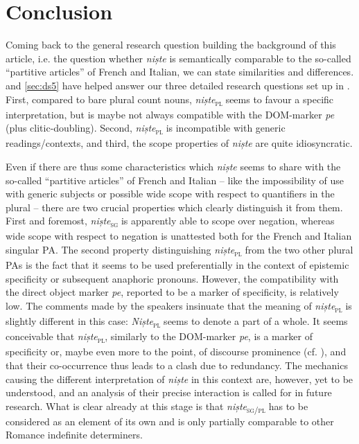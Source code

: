 \documentclass[output=paper,colorlinks,citecolor=brown]{langscibook}
\begin{document}
\section{Conclusion}\label{sec:ds6}
Coming back to the general research question building the background of this article, i.e. the question whether \textit{niște} is semantically comparable to the so-called “partitive articles” of French and Italian, we can state similarities and differences.  and \ref{sec:ds5} have helped answer our three detailed research questions set up in . First, compared to bare plural count nouns, \textit{niște}\textsubscript{\textsc{pl}} seems to favour a specific interpretation, but is maybe not always compatible with the DOM-marker \textit{pe} (plus clitic-doubling). Second, \textit{niște}\textsubscript{\textsc{pl}} is incompatible with generic readings/contexts, and third, the scope properties of \textit{niște} are quite idiosyncratic. 

Even if there are thus some characteristics which \textit{niște} seems to share with the so-called “partitive articles” of French and Italian -- like the impossibility of use with generic subjects or possible wide scope with respect to quantifiers in the plural -- there are two crucial properties which clearly distinguish it from them. First and foremost, \textit{niște}\textsubscript{\textsc{sg}} is apparently able to scope over negation, whereas wide scope with respect to negation is unattested both for the French and Italian singular PA. The second property distinguishing \textit{niște}\textsubscript{\textsc{pl}} from the two other plural PAs is the fact that it seems to be used preferentially in the context of epistemic specificity or subsequent anaphoric pronouns. However, the compatibility with the direct object marker \textit{pe}, reported to be a marker of specificity, is relatively low. The comments made by the speakers insinuate that the meaning of \textit{niște}\textsubscript{\textsc{pl}} is slightly different in this case: \textit{Niște}\textsubscript{\textsc{pl}} seems to denote a part of a whole. It seems conceivable that \textit{niște}\textsubscript{\textsc{pl}}, similarly to the DOM-marker \textit{pe}, is a marker of specificity or, maybe even more to the point, of discourse prominence (cf. \citealt{ChiriacescuHeusinger2009, ChiriacescuHeusinger2010, HeusingerChiriacescu2013}), and that their co-occurrence thus leads to a clash due to redundancy. The mechanics causing the different interpretation of \textit{niște} in this context are, however, yet to be understood, and an analysis of their precise interaction is called for in future research. What is clear already at this stage is that \textit{niște}\textsubscript{\textsc{sg/pl}} has to be considered as an element of its own and is only partially comparable to other Romance indefinite determiners.
\end{document}
